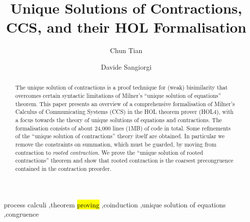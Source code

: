 \documentclass[3p,preprint]{elsarticle}
\newcommand{\univariate}{univariable\xspace}
\newcommand{\multivariate}{multivariable\xspace}
\begin{document}
\ifrebuttal
{}

%


\newpage
\setcounter{page}{0}
\fi

\begin{frontmatter}

\title{Unique Solutions of Contractions, CCS, and their HOL
  Formalisation}

\author[mymainaddress]{Chun Tian}
\address[mymainaddress]{University of Trento, Italy and
  Fondazione Bruno Kessler, Italy}

\author[mysecondaryaddress]{Davide Sangiorgi}
\address[mysecondaryaddress]{University of Bologna, Italy and INRIA, France}

\begin{abstract}
  The unique solution of contractions is a proof technique for
  (weak) bisimilarity that overcomes certain syntactic limitations of
  Milner's ``unique solution of equations'' theorem.  This paper
  presents an overview of a comprehensive formalisation of
  Milner's Calculus of Communicating Systems (CCS)
  in the HOL theorem prover (HOL4), with a
  focus towards the theory of unique solutions of equations and contractions.
  The formalisation consists of about 24,000 lines (1MB) of code in total.
  Some refinements of the ``unique solution of contractions'' theory itself are obtained.
  In particular we remove the constraints on summation,
  which must be guarded, by moving from contraction to \emph{rooted
  contraction}. We prove the ``unique solution of rooted
  contractions'' theorem %
  and show that rooted contraction is the coarsest
  precongruence contained in the contraction preorder. 
\end{abstract}

\begin{keyword}
process calculi \sep theorem \hl{proving} \sep coinduction \sep unique
solution of equations \sep congruence
\end{keyword}

\end{frontmatter}

\linenumbers



















\end{document}
